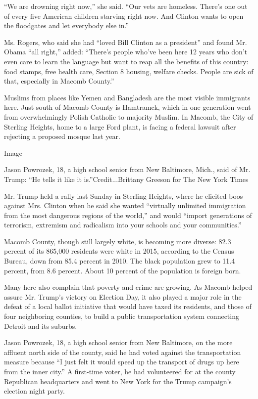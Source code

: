 ``We are drowning right now,'' she said. ``Our vets are homeless.
There's one out of every five American children starving right now. And
Clinton wants to open the floodgates and let everybody else in.''

Ms. Rogers, who said she had ``loved Bill Clinton as a president'' and
found Mr. Obama ``all right,'' added: ``There's people who've been here
12 years who don't even care to learn the language but want to reap all
the benefits of this country: food stamps, free health care, Section 8
housing, welfare checks. People are sick of that, especially in Macomb
County.''

Muslims from places like Yemen and Bangladesh are the most visible
immigrants here. Just south of Macomb County is Hamtramck, which in one
generation went from overwhelmingly Polish Catholic to majority Muslim.
In Macomb, the City of Sterling Heights, home to a large Ford plant, is
facing a federal lawsuit after rejecting a proposed mosque last year.

Image

Jason Powrozek, 18, a high school senior from New Baltimore, Mich., said
of Mr. Trump: ``He tells it like it is.''Credit...Brittany Greeson for
The New York Times

Mr. Trump held a rally last Sunday in Sterling Heights, where he
elicited boos against Mrs. Clinton when he said she wanted ``virtually
unlimited immigration from the most dangerous regions of the world,''
and would ``import generations of terrorism, extremism and radicalism
into your schools and your communities.''

Macomb County, though still largely white, is becoming more diverse:
82.3 percent of its 865,000 residents were white in 2015, according to
the Census Bureau, down from 85.4 percent in 2010. The black population
grew to 11.4 percent, from 8.6 percent. About 10 percent of the
population is foreign born.

Many here also complain that poverty and crime are growing. As Macomb
helped assure Mr. Trump's victory on Election Day, it also played a
major role in the defeat of a local ballot initiative that would have
taxed its residents, and those of four neighboring counties, to build a
public transportation system connecting Detroit and its suburbs.

Jason Powrozek, 18, a high school senior from New Baltimore, on the more
affluent north side of the county, said he had voted against the
transportation measure because ``I just felt it would speed up the
transport of drugs up here from the inner city.'' A first-time voter, he
had volunteered for at the county Republican headquarters and went to
New York for the Trump campaign's election night party.

